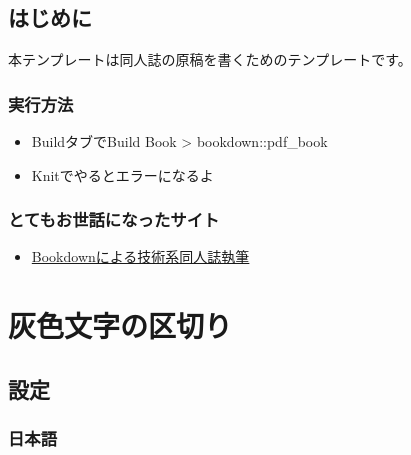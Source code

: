 \documentclass[
  xelatex,ja=standard, b5paper]{bxjsbook}
\author{}
\date{\vspace{-2.5em}}
\providecommand{\tightlist}{%
  \setlength{\itemsep}{0pt}\setlength{\parskip}{0pt}}
\begin{document}
{
\setcounter{tocdepth}{1}
\tableofcontents
}
\hypertarget{hajimeni}{%
\chapter*{はじめに}\label{hajimeni}}

本テンプレートは同人誌の原稿を書くためのテンプレートです。

\hypertarget{ux5b9fux884cux65b9ux6cd5}{%
\section{実行方法}\label{ux5b9fux884cux65b9ux6cd5}}

\begin{itemize}
\tightlist
\item
  BuildタブでBuild Book \textgreater{} bookdown::pdf\_book
\item
  Knitでやるとエラーになるよ
\end{itemize}

\hypertarget{ux3068ux3066ux3082ux304aux4e16ux8a71ux306bux306aux3063ux305fux30b5ux30a4ux30c8}{%
\section{とてもお世話になったサイト}\label{ux3068ux3066ux3082ux304aux4e16ux8a71ux306bux306aux3063ux305fux30b5ux30a4ux30c8}}

\begin{itemize}
\tightlist
\item
  \href{https://teastat.blogspot.com/2019/01/bookdown.html}{Bookdownによる技術系同人誌執筆}
\end{itemize}

\hypertarget{haiiro}{%
\part{灰色文字の区切り}\label{haiiro}}

\hypertarget{setting}{%
\chapter{設定}\label{setting}}

\hypertarget{setting_japanese}{%
\section{日本語}\label{setting_japanese}}
\end{document}
